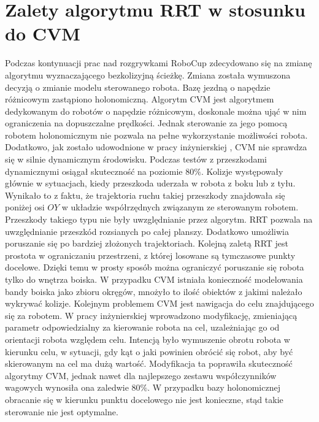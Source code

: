 \section{Zalety algorytmu RRT w stosunku \\do CVM}
Podczas kontynuacji prac nad rozgrywkami RoboCup zdecydowano się na zmianę algorytmu wyznaczającego bezkolizyjną ścieżkę. Zmiana została wymuszona decyzją o zmianie
modelu sterowanego robota. Bazę jezdną o napędzie różnicowym zastąpiono holonomiczną. Algorytm CVM jest algorytmem dedykowanym do robotów o napędzie różnicowym, doskonale
można ująć w nim ograniczenia na dopuszczalne prędkości. Jednak sterowanie za jego pomocą robotem holonomicznym nie pozwala na pełne wykorzystanie możliwości robota.
Dodatkowo, jak zostało udowodnione w pracy inżynierskiej \cite{inzynierka}, CVM nie sprawdza się w silnie dynamicznym środowisku. Podczas testów z przeszkodami dynamicznymi osiągał
skuteczność na poziomie $80\%$. Kolizje występowały głównie w sytuacjach, kiedy przeszkoda uderzała w robota z boku lub z tyłu. Wynikało to z faktu, że trajektoria ruchu takiej przeszkody znajdowała się poniżej osi $OY$ w układzie współrzędnych
związanym ze sterowanym robotem. Przeszkody takiego typu nie były uwzględnianie przez algorytm.
RRT pozwala na uwzględnianie przeszkód rozsianych po całej planszy. Dodatkowo umożliwia poruszanie się po bardziej złożonych trajektoriach.
Kolejną zaletą RRT jest prostota w ograniczaniu przestrzeni, z której losowane są tymczasowe punkty docelowe. Dzięki temu w prosty sposób można ograniczyć poruszanie
się robota tylko do wnętrza boiska. W przypadku CVM istniała konieczność modelowania bandy boiska jako zbioru okręgów, mnożyło to ilość obiektów z jakimi należało wykrywać
kolizje.
Kolejnym problemem CVM jest nawigacja do celu znajdującego się za robotem. W pracy inżynierskiej wprowadzono modyfikację, zmieniającą parametr odpowiedzialny za kierowanie
robota na cel, uzależniając go od orientacji robota względem celu. Intencją było wymuszenie obrotu robota w kierunku celu, w sytuacji, gdy kąt o jaki powinien obrócić się robot, aby być skierowanym
na cel ma dużą wartość.
Modyfikacja ta poprawiła skuteczność algorytmy CVM, jednak nawet dla najlepszego zestawu współczynników wagowych wynosiła ona zaledwie $80\%$. W przypadku bazy holonomicznej obracanie się w kierunku punktu docelowego nie jest
konieczne, stąd takie sterowanie nie jest optymalne.